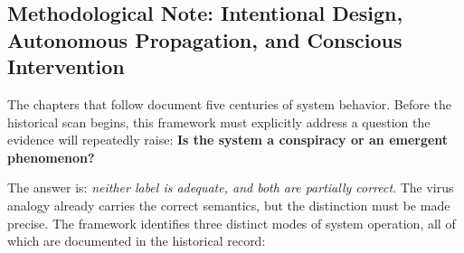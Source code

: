 \subsection{Methodological Note: Intentional Design, Autonomous Propagation, and Conscious Intervention}
\label{sec:conspiracy_emergence}

The chapters that follow document five centuries of system behavior. Before the historical scan begins, this framework must explicitly address a question the evidence will repeatedly raise: \textbf{Is the system a conspiracy or an emergent phenomenon?}

The answer is: \textit{neither label is adequate, and both are partially correct}. The virus analogy already carries the correct semantics, but the distinction must be made precise. The framework identifies three distinct modes of system operation, all of which are documented in the historical record:

